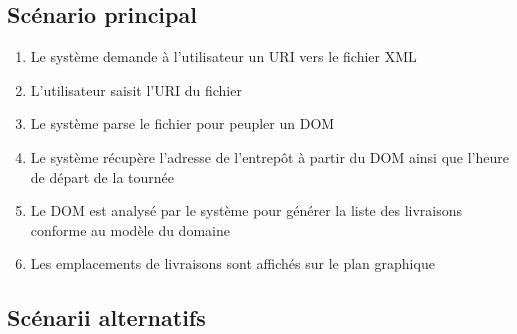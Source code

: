 \subsection{Scénario principal}

\begin{enumerate}
\item Le système demande à l'utilisateur un URI vers le fichier XML
\item L'utilisateur saisit l'URI du fichier
\item Le système parse le fichier pour peupler un DOM
\item Le système récupère l'adresse de l'entrepôt à partir du DOM ainsi que l'heure de départ de la tournée
\item Le DOM est analysé par le système pour générer la liste des livraisons conforme au modèle du domaine
\item Les emplacements de livraisons sont affichés sur le plan graphique
\end{enumerate}

\subsection{Scénarii alternatifs}

